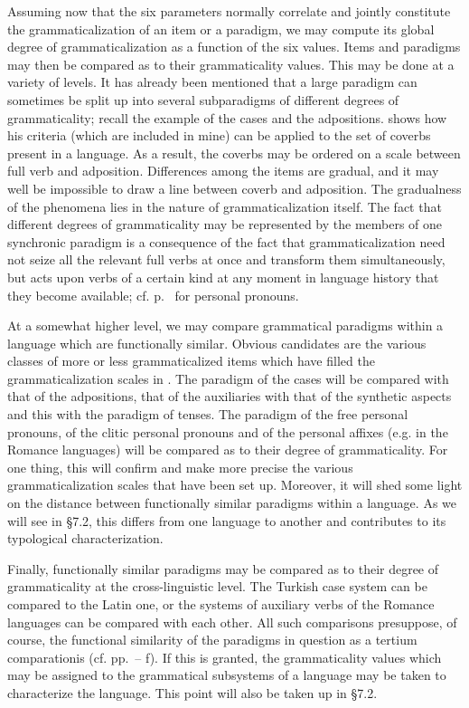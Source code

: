 Assuming now that the six parameters normally correlate and jointly constitute the grammaticalization of an item or a paradigm, we may compute its global degree of grammaticalization as a function of the six values. Items and paradigms may then be compared as to their grammaticality values. This may be done at a variety of levels. It has already been mentioned that a large paradigm can sometimes be split up into several subparadigms of different degrees of grammaticality; recall the example of the cases and the adpositions. \citet[86]{Givón1975} shows how his criteria (which are included in mine) can be applied to the set of coverbs present in a language. As a result, the coverbs may be ordered on a scale between full verb and adposition. Differences among the items are gradual, and it may well be impossible to draw a line between coverb and adposition. The gradualness of the phenomena lies in the nature of grammaticalization itself. The fact that different degrees of grammaticality may be represented by the members of one synchronic paradigm is a consequence of the fact that grammaticalization need not seize all the relevant full verbs at once and transform them simultaneously, but acts upon verbs of a certain kind at any moment in language history that they become available; cf. p.~\pageref{page43}\chk%
 for personal pronouns.

At a somewhat higher level, we may compare grammatical paradigms within a language which are functionally similar. Obvious candidates are the various classes of more or less grammaticalized items which have filled the grammaticalization scales in . The paradigm of the cases will be compared with that of the adpositions, that of the auxiliaries with that of the synthetic aspects and this with the paradigm of tenses. The paradigm of the free personal pronouns, of the clitic personal pronouns and of the personal affixes (e.g. in the Romance languages) will be compared as to their degree of grammaticality. For one thing, this will confirm and make more precise the various grammaticalization scales that have been set up. Moreover, it will shed some light on the distance between functionally similar paradigms within a language. As we will see in §7.2, this differs from one language to another and contributes to its typological characterization.

Finally, functionally similar paradigms may be compared as to their degree of grammaticality at the cross-linguistic level. The Turkish case system can be compared to the Latin one, or the systems of auxiliary verbs of the Romance languages can be compared with each other. All such comparisons presuppose, of course, the functional similarity of the paradigms in question as a tertium comparationis (cf. pp.~\pageref{page135}--\pageref{page135b}\chk%
f). If this is granted, the grammaticality values which may be assigned to the grammatical subsystems of a language may be taken to characterize the language. This point will also be taken up in §7.2.

